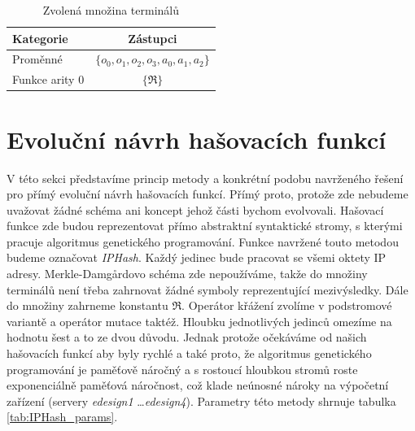 \begin{table}
\begin{center}
\begin{tabular}{ |l|c| }
	\hline
   	Kategorie & Zástupci \\
  	\hline
  	Proměnné       & $\{o_0, o_1, o_2, o_3, a_0, a_1, a_2\}$ \\
  	Funkce arity 0 & $\{ \Re \}$ \\	 
  	\hline
\end{tabular}
\caption{Zvolená množina terminálů}
\label{tab:terminal_set_design}
\end{center}
\end{table}

\section{Evoluční návrh hašovacích funkcí}
V této sekci představíme princip metody a konkrétní podobu navrženého řešení pro přímý evoluční 
návrh hašovacích funkcí. Přímý proto, protože zde nebudeme uvažovat žádné schéma ani koncept
jehož části bychom evolvovali. Hašovací funkce zde budou reprezentovat přímo abstraktní syntaktické
stromy, s kterými pracuje algoritmus genetického programování. Funkce navržené touto metodou 
budeme označovat \textit{IPHash}. Každý jedinec bude pracovat se všemi oktety IP adresy.
Merkle-Damg\r{a}rdovo schéma zde nepoužíváme, takže do množiny terminálů není třeba zahrnovat
žádné symboly reprezentující mezivýsledky. Dále do množiny zahrneme konstantu  $\Re$. Operátor
křážení zvolíme v podstromové variantě a operátor mutace taktéž. Hloubku jednotlivých jedinců omezíme
na hodnotu šest a to ze dvou důvodu. Jednak protože očekáváme od našich hašovacích funkcí aby byly
rychlé a také proto, že algoritmus genetického programování je paměťově náročný a s rostoucí hloubkou
stromů roste exponenciálně paměťová náročnost, což klade neúnosné nároky na výpočetní zařízení 
(servery \textit{edesign1} \ldots \textit{edesign4}). Parametry této metody shrnuje 
tabulka \ref{tab:IPHash_params}.

